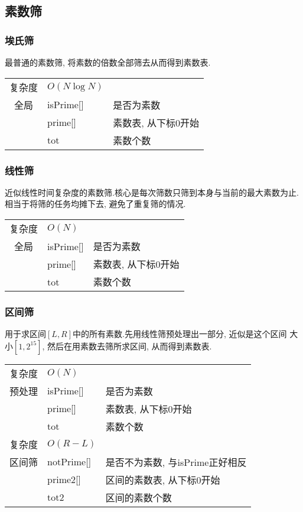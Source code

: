     \subsection{素数筛}\small


        \subsubsection{埃氏筛}\small
最普通的素数筛, 将素数的倍数全部筛去从而得到素数表.

\begin{longtable}{|c|l|l|}
复杂度 & $O(N \log N)$ &  \\
全局 & isPrime[] & 是否为素数 \\
 & prime[] & 素数表, 从下标0开始 \\
 & tot & 素数个数 \\
\end{longtable}



        \subsubsection{线性筛}\small
近似线性时间复杂度的素数筛.核心是每次筛数只筛到本身与当前的最大素数为止.
相当于将筛的任务均摊下去, 避免了重复筛的情况.

\begin{longtable}{|c|l|l|}
复杂度 & $O(N)$ &  \\
全局 & isPrime[] & 是否为素数 \\
 & prime[] & 素数表, 从下标0开始 \\
 & tot & 素数个数 \\
\end{longtable}



        \subsubsection{区间筛}\small
用于求区间$[L, R]$中的所有素数.先用线性筛预处理出一部分, 近似是这个区间
大小$[1, 2^{15}]$, 然后在用素数去筛所求区间, 从而得到素数表.

\begin{longtable}{|c|l|l|}
复杂度 & $O(N)$ &  \\
预处理 & isPrime[] & 是否为素数 \\
 & prime[] & 素数表, 从下标0开始 \\
 & tot & 素数个数 \\
 复杂度 & $O(R - L)$ &  \\
区间筛 & notPrime[] & 是否不为素数, 与isPrime正好相反 \\
 & prime2[] & 区间的素数表, 从下标0开始 \\
 & tot2 & 区间的素数个数 \\
\end{longtable}



